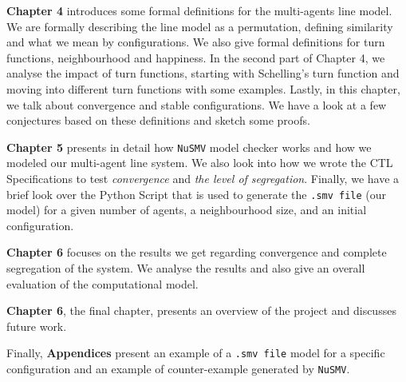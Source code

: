 \documentclass[../main.tex]{subfiles}
\begin{document}
\textbf{Chapter 4} introduces some formal definitions for the multi-agents line model. We are formally describing the line model as a permutation, defining similarity and what we mean by configurations. We also give formal definitions for turn functions, neighbourhood and happiness. In the second part of Chapter 4, we analyse the impact of turn functions, starting with Schelling's turn function and moving into different turn functions with some examples. Lastly, in this chapter, we talk about convergence and stable configurations. We have a look at a few conjectures based on these definitions and sketch some proofs.

\textbf{Chapter 5} presents in detail how \verb|NuSMV| model checker works and how we modeled our multi-agent line system. We also look into how we wrote the CTL Specifications to test \textit{convergence} and \textit{the level of segregation}. Finally, we have a brief look over the Python Script that is used to generate the \verb|.smv file| (our model) for a given number of agents, a neighbourhood size, and an initial configuration.

\textbf{Chapter 6} focuses on the results we get regarding convergence and complete segregation of the system. We analyse the results and also give an overall evaluation of the computational model.

\textbf{Chapter 6}, the final chapter, presents an overview of the project and discusses future work.

Finally,  \textbf{Appendices} present an example of a \verb|.smv file| model for a specific configuration and an example of counter-example generated by \verb|NuSMV|.
\end{document}
